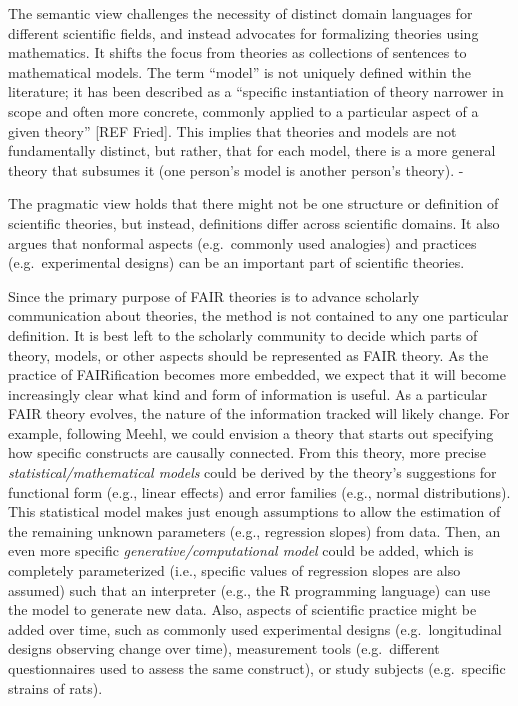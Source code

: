 \documentclass[
  man,floatsintext]{apa6}
\begin{document}
The semantic view challenges the necessity of distinct domain languages for different scientific fields, and instead advocates for formalizing theories using mathematics.
It shifts the focus from theories as collections of sentences to mathematical models.
The term ``model'' is not uniquely defined within the literature;
it has been described as a ``specific instantiation of theory narrower in scope and often more concrete, commonly applied to a particular aspect of a given theory'' {[}REF Fried{]}.
This implies that theories and models are not fundamentally distinct, but rather, that for each model, there is a more general theory that subsumes it (one person's model is another person's theory).
-

The pragmatic view holds that there might not be one structure or definition of scientific theories, but instead, definitions differ across scientific domains.
It also argues that nonformal aspects (e.g.~commonly used analogies) and practices (e.g.~experimental designs) can be an important part of scientific theories.

Since the primary purpose of FAIR theories is to advance scholarly communication about theories,
the method is not contained to any one particular definition.
It is best left to the scholarly community to decide which parts of theory, models, or other aspects should be represented as FAIR theory.
As the practice of FAIRification becomes more embedded,
we expect that it will become increasingly clear what kind and form of information is useful.
As a particular FAIR theory evolves, the nature of the information tracked will likely change.
For example, following Meehl, we could envision a theory that starts out specifying how specific constructs are causally connected.
From this theory, more precise \emph{statistical/mathematical models} could be derived by the theory's suggestions for functional form (e.g., linear effects) and error families (e.g., normal distributions).
This statistical model makes just enough assumptions to allow the estimation of the remaining unknown parameters (e.g., regression slopes) from data.
Then, an even more specific \emph{generative/computational model} could be added, which is completely parameterized (i.e., specific values of regression slopes are also assumed) such that an interpreter (e.g., the R programming language) can use the model to generate new data.
Also, aspects of scientific practice might be added over time, such as commonly used experimental designs (e.g.~longitudinal designs observing change over time), measurement tools (e.g.~different questionnaires used to assess the same construct), or study subjects (e.g.~specific strains of rats).
\end{document}
